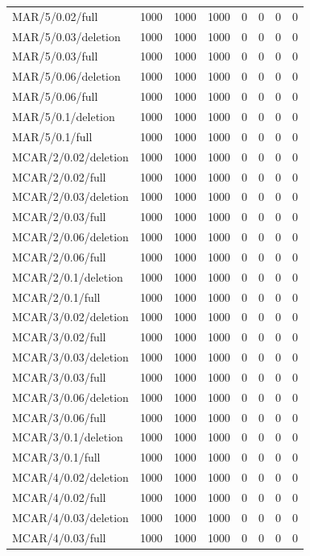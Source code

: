 \begin{longtable}{p{1.5in}p{.6in}p{.6in}p{.5in}p{.5in}p{.5in}p{.6in}p{.7in}}
MAR/5/0.02/full & 1000 & 1000 & 1000 & 0 & 0 & 0 & 0\\
MAR/5/0.03/deletion & 1000 & 1000 & 1000 & 0 & 0 & 0 & 0\\
MAR/5/0.03/full & 1000 & 1000 & 1000 & 0 & 0 & 0 & 0\\
MAR/5/0.06/deletion & 1000 & 1000 & 1000 & 0 & 0 & 0 & 0\\
MAR/5/0.06/full & 1000 & 1000 & 1000 & 0 & 0 & 0 & 0\\
MAR/5/0.1/deletion & 1000 & 1000 & 1000 & 0 & 0 & 0 & 0\\
MAR/5/0.1/full & 1000 & 1000 & 1000 & 0 & 0 & 0 & 0\\
MCAR/2/0.02/deletion & 1000 & 1000 & 1000 & 0 & 0 & 0 & 0\\
MCAR/2/0.02/full & 1000 & 1000 & 1000 & 0 & 0 & 0 & 0\\
MCAR/2/0.03/deletion & 1000 & 1000 & 1000 & 0 & 0 & 0 & 0\\
MCAR/2/0.03/full & 1000 & 1000 & 1000 & 0 & 0 & 0 & 0\\
MCAR/2/0.06/deletion & 1000 & 1000 & 1000 & 0 & 0 & 0 & 0\\
MCAR/2/0.06/full & 1000 & 1000 & 1000 & 0 & 0 & 0 & 0\\
MCAR/2/0.1/deletion & 1000 & 1000 & 1000 & 0 & 0 & 0 & 0\\
MCAR/2/0.1/full & 1000 & 1000 & 1000 & 0 & 0 & 0 & 0\\
MCAR/3/0.02/deletion & 1000 & 1000 & 1000 & 0 & 0 & 0 & 0\\
MCAR/3/0.02/full & 1000 & 1000 & 1000 & 0 & 0 & 0 & 0\\
MCAR/3/0.03/deletion & 1000 & 1000 & 1000 & 0 & 0 & 0 & 0\\
MCAR/3/0.03/full & 1000 & 1000 & 1000 & 0 & 0 & 0 & 0\\
MCAR/3/0.06/deletion & 1000 & 1000 & 1000 & 0 & 0 & 0 & 0\\
MCAR/3/0.06/full & 1000 & 1000 & 1000 & 0 & 0 & 0 & 0\\
MCAR/3/0.1/deletion & 1000 & 1000 & 1000 & 0 & 0 & 0 & 0\\
MCAR/3/0.1/full & 1000 & 1000 & 1000 & 0 & 0 & 0 & 0\\
MCAR/4/0.02/deletion & 1000 & 1000 & 1000 & 0 & 0 & 0 & 0\\
MCAR/4/0.02/full & 1000 & 1000 & 1000 & 0 & 0 & 0 & 0\\
MCAR/4/0.03/deletion & 1000 & 1000 & 1000 & 0 & 0 & 0 & 0\\
MCAR/4/0.03/full & 1000 & 1000 & 1000 & 0 & 0 & 0 & 0\\

\end{longtable}
